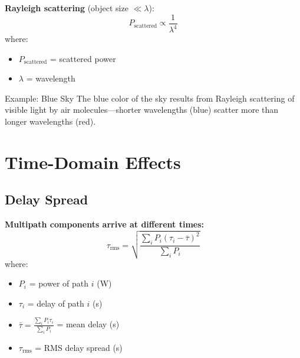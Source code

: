 \textbf{Rayleigh scattering} (object size $\ll \lambda$):
\begin{equation}
P_{\text{scattered}} \propto \frac{1}{\lambda^4}
\label{eq:rayleigh-scattering}
\end{equation}
where:
\begin{itemize}
\item $P_{\text{scattered}}$ = scattered power
\item $\lambda$ = wavelength
\end{itemize}

\begin{calloutbox}{Example: Blue Sky}
The blue color of the sky results from Rayleigh scattering of visible light by air molecules---shorter wavelengths (blue) scatter more than longer wavelengths (red).
\end{calloutbox}

\section{Time-Domain Effects}

\subsection{Delay Spread}

\textbf{Multipath components arrive at different times:}
\begin{equation}
\tau_{\text{rms}} = \sqrt{\frac{\sum_i P_i (\tau_i - \bar{\tau})^2}{\sum_i P_i}}
\label{eq:rms-delay-spread}
\end{equation}
where:
\begin{itemize}
\item $P_i$ = power of path $i$ (W)
\item $\tau_i$ = delay of path $i$ (s)
\item $\bar{\tau} = \frac{\sum_i P_i \tau_i}{\sum_i P_i}$ = mean delay (s)
\item $\tau_{\text{rms}}$ = RMS delay spread (s)
\end{itemize}

